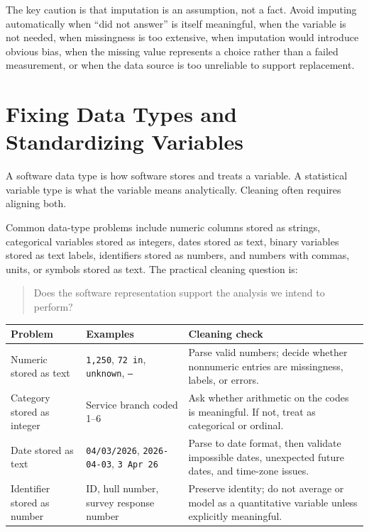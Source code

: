 {The key caution is that imputation is an assumption, not a fact.  Avoid imputing automatically when ``did not answer'' is itself meaningful, when the variable is not needed, when missingness is too extensive, when imputation would introduce obvious bias, when the missing value represents a choice rather than a failed measurement, or when the data source is too unreliable to support replacement.

\section{Fixing Data Types and Standardizing Variables}

A software data type is how software stores and treats a variable.  A statistical variable type is what the variable means analytically.  Cleaning often requires aligning both.

Common data-type problems include numeric columns stored as strings, categorical variables stored as integers, dates stored as text, binary variables stored as text labels, identifiers stored as numbers, and numbers with commas, units, or symbols stored as text.  The practical cleaning question is:
\begin{quote}
  Does the software representation support the analysis we intend to perform?
\end{quote}

\begin{center}
\begin{tabular}{p{}p{}p{}}
\hline
\textbf{Problem} & \textbf{Examples} & \textbf{Cleaning check} \\
\hline
Numeric stored as text & \texttt{1,250}, \texttt{72 in}, \texttt{unknown}, \texttt{--} & Parse valid numbers; decide whether nonnumeric entries are missingness, labels, or errors. \\
Category stored as integer & Service branch coded 1--6 & Ask whether arithmetic on the codes is meaningful. If not, treat as categorical or ordinal. \\
Date stored as text & \texttt{04/03/2026}, \texttt{2026-04-03}, \texttt{3 Apr 26} & Parse to date format, then validate impossible dates, unexpected future dates, and time-zone issues. \\
Identifier stored as number & ID, hull number, survey response number & Preserve identity; do not average or model as a quantitative variable unless explicitly meaningful. \\
\hline
\end{tabular}
\end{center}

}
